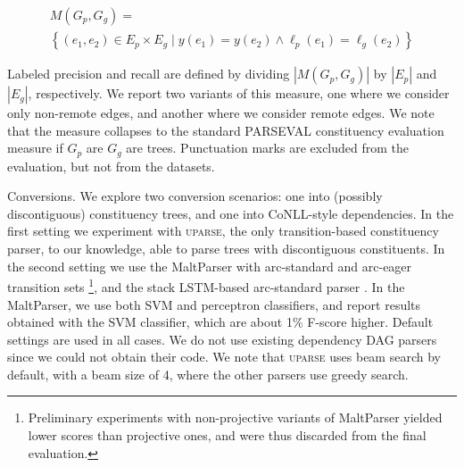 \documentclass[11pt]{article}
\makeatletter
\renewcommand{\paragraph}{
  \@startsection{paragraph}{4}
  {\z@}{.5ex \@plus .5ex \@minus .2ex}{-1em}
  {\normalfont\normalsize\bfseries}
}
\makeatother
\begin{document}
\vspace{-.6cm}

{\small
\begin{multline*}
    M(G_p,G_g) = \\
    \left\{(e_1,e_2) \in E_p \times E_g \;|\;
    y(e_1) = y(e_2) \wedge \ell_p(e_1)=\ell_g(e_2)\right\}
\end{multline*}
}

\vspace{-.6cm}

Labeled precision and recall are defined by dividing $|M(G_p,G_g)|$ by $|E_p|$ and $|E_g|$, respectively.
We report two variants of this measure, one where we consider only non-remote edges,
and another where we consider remote edges. We note that the measure collapses to the standard
PARSEVAL constituency evaluation measure if $G_p$ are $G_g$ are trees.
Punctuation marks are excluded from the evaluation, but not from the datasets.


\paragraph{Conversions.}
We explore two conversion scenarios: one into (possibly discontiguous) constituency trees,
and one into CoNLL-style dependencies. In the first setting we experiment with \textsc{uparse},
the only transition-based constituency parser, to our knowledge, able to parse trees with
discontiguous constituents.
In the second setting we use the MaltParser with arc-standard and
arc-eager transition sets \cite{nivre2007maltparser}\footnote{Preliminary
experiments with non-projective variants of MaltParser yielded lower scores than
projective ones, and were thus discarded from the final evaluation.},
and the stack LSTM-based arc-standard parser \cite{dyer2015transition}.
In the MaltParser, we use both SVM and perceptron classifiers, and report
results obtained with the SVM classifier, which are about 1\% F-score higher.
Default settings are used in all cases.
We do not use existing dependency DAG parsers since we could not obtain their code.
We note that \textsc{uparse} uses beam search by default,
with a beam size of 4, where the other parsers use greedy search.

\end{document}
